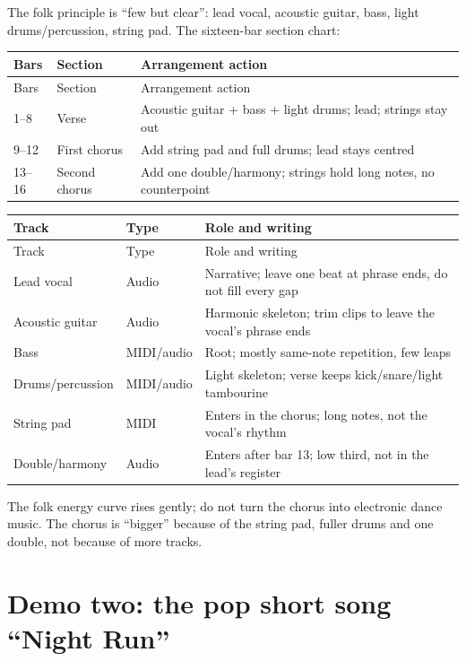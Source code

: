 The folk principle is ``few but clear'': lead vocal, acoustic guitar, bass, light drums/percussion, string pad. The sixteen-bar section chart:

\begin{longtable}{p{}p{}p{}}
\toprule
Bars & Section & Arrangement action \\
\midrule
\endfirsthead
\toprule
Bars & Section & Arrangement action \\
\midrule
\endhead
1--8 & Verse & Acoustic guitar + bass + light drums; lead; strings stay out \\
9--12 & First chorus & Add string pad and full drums; lead stays centred \\
13--16 & Second chorus & Add one double/harmony; strings hold long notes, no counterpoint \\
\bottomrule
\end{longtable}

\begin{longtable}{p{}p{}p{}}
\toprule
Track & Type & Role and writing \\
\midrule
\endfirsthead
\toprule
Track & Type & Role and writing \\
\midrule
\endhead
Lead vocal & Audio & Narrative; leave one beat at phrase ends, do not fill every gap \\
Acoustic guitar & Audio & Harmonic skeleton; trim clips to leave the vocal's phrase ends \\
Bass & MIDI/audio & Root; mostly same-note repetition, few leaps \\
Drums/percussion & MIDI/audio & Light skeleton; verse keeps kick/snare/light tambourine \\
String pad & MIDI & Enters in the chorus; long notes, not the vocal's rhythm \\
Double/harmony & Audio & Enters after bar 13; low third, not in the lead's register \\
\bottomrule
\end{longtable}

The folk energy curve rises gently; do not turn the chorus into electronic dance music. The chorus is ``bigger'' because of the string pad, fuller drums and one double, not because of more tracks.

\section{Demo two: the pop short song ``Night Run''}
\label{sec:pop-demo}

